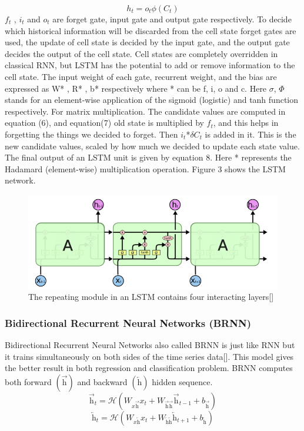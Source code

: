 \documentclass[12pt,a4paper]{article}
\begin{document}
\begin{equation}
    h_t = o_t\phi(C_t)
\end{equation}
$f_t$ , $i_t$ and $o_t$ are forget gate, input gate and output gate respectively. To decide which
historical information will be discarded from the cell state forget gates are used, the update of
cell state is decided by the input gate, and the output
gate decides the output of the cell state. Cell states are completely overridden in classical RNN, but LSTM has the potential to add
or remove information to the cell state. The input weight of each gate, recurrent weight, and the
bias are expressed as W* , R* , b*  respectively where * can be f, i, o and c. Here $\sigma$, $\Phi$ stands
for an element-wise application of the sigmoid (logistic) and tanh function respectively. For matrix
multiplication. The candidate values are computed in equation (6), and equation(7) old state
is multiplied by $f_t$, and this helps in forgetting the things we decided to forget. Then $i_t$*$\delta C_t$ is
added in it. This is the new candidate values, scaled by how much we decided to update each state
value. The final output of an LSTM unit is given by equation 8. Here * represents the Hadamard
(element-wise) multiplication operation. Figure 3 shows the LSTM network.
\begin{figure}[h]
    \centering
    \includegraphics[width=5in]{lstm.png}
    \caption{The repeating module in an LSTM contains four interacting layers[]}
    \label{fig:lstm}
\end{figure}

\subsubsection{Bidirectional Recurrent Neural Networks (BRNN)}
Bidirectional Recurrent Neural Networks also called BRNN is just like RNN but it trains simultaneously on both sides of the time series data[]. This model gives the better result in both regression and classification problem. BRNN computes both forward $(\overrightarrow{\text{h}})$ and backward $(\overleftarrow{\text{h}})$ hidden sequence.
\begin{equation}
    \overrightarrow{\text{h}}_t = \mathcal{H}(W_{x\overrightarrow{\text{h}}} x_t + W_{\overrightarrow{\text{h}} \overrightarrow{\text{h}}} \overrightarrow{\text{h}}_{t-1} + b_{\overrightarrow{\text{h}}})
\end{equation}
\begin{equation}
    \overleftarrow{\text{h}}_t = \mathcal{H}(W_{x\overleftarrow{\text{h}}} x_t + W_{\overleftarrow{\text{h}} \overleftarrow{\text{h}}} \overleftarrow{\text{h}}_{t+1} + b_{\overleftarrow{\text{h}}})
\end{equation}
\end{document}

